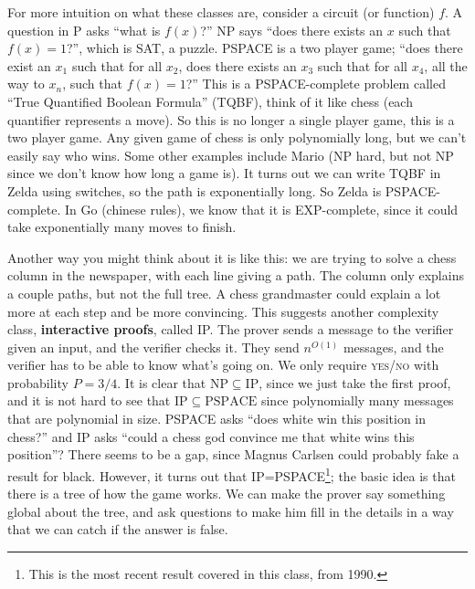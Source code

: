 For more intuition on what these classes are, consider a circuit (or function) $f$. A question in P asks ``what is $f(x)$?'' NP says ``does there exists an $x$ such that $f(x)=1$?'', which is SAT, a puzzle. PSPACE is a two player game; ``does there exist an $x_1$ such that for all $x_2$, does there exists an $x_3$ such that for all $x_4$, all the way to $x_n $, such that $f(x)=1$?'' This is a PSPACE-complete problem called ``True Quantified Boolean Formula'' (TQBF), think of it like chess (each quantifier represents a move). So this is no longer a single player game, this is a two player game. Any given game of chess is only polynomially long, but we can't easily say who wins. Some other examples include Mario (NP hard, but not NP since we don't know how long a game is). It turns out we can write TQBF in Zelda using switches, so the path is exponentially long. So Zelda is PSPACE-complete. In Go (chinese rules), we know that it is EXP-complete, since it could take exponentially many moves to finish.

Another way you might think about it is like this: we are trying to solve a chess column in the newspaper, with each line giving a path. The column only explains a couple paths, but not the full tree. A chess grandmaster could explain a lot more at each step and be more convincing. This suggests another complexity class, \textbf{interactive proofs}, called IP. The prover sends a message to the verifier given an input, and the verifier checks it. They send $n ^{O(1)}$ messages, and the verifier has to be able to know what's going on. We only require \textsc{yes/no} with probability $P=3/4$. It is clear that $\mathrm{NP}\subseteq \mathrm{IP}$, since we just take the first proof, and it is not hard to see that $\mathrm{IP}\subseteq \mathrm{PSPACE}$ since polynomially many messages that are polynomial in size. PSPACE asks ``does white win this position in chess?'' and IP asks ``could a chess god convince me that white wins this position''? There seems to be a gap, since Magnus Carlsen could probably fake a result for black. However, it turns out that IP=PSPACE\footnote{This is the most recent result covered in this class, from 1990.}; the basic idea is that there is a tree of how the game works. We can make the prover say something global about the tree, and ask questions to make him fill in the details in a way that we can catch if the answer is false.
